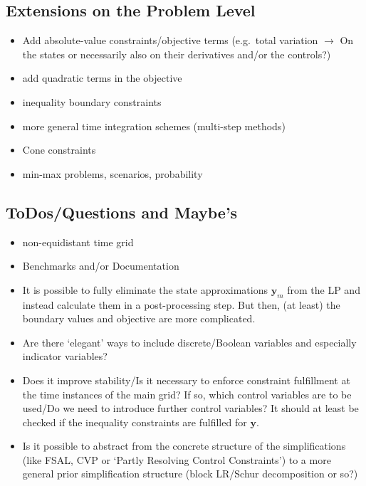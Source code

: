 \documentclass{article}
\newcommand{\vectorfont}[1]{\boldsymbol{#1}}%
\newcommand{\yvec}{\vectorfont{y}}
\begin{document}
\subsection*{Extensions on the Problem Level}

\begin{itemize}
	\item Add absolute-value constraints/objective terms (e.g.\ total variation $\to$ On the states or necessarily also on their derivatives and/or the controls?)
	\item add quadratic terms in the objective
	\item inequality boundary constraints
	\item more general time integration schemes (multi-step methods)
	\item Cone constraints
	\item min-max problems, scenarios, probability
\end{itemize}
\appendix

\subsection*{ToDos/Questions and Maybe's}

\begin{itemize}
	\item non-equidistant time grid
	\item Benchmarks and/or Documentation
	\item It is possible to fully eliminate the state approximations $\yvec_{m}$ from the LP and instead calculate them in a post-processing step.
	But then, (at least) the boundary values and objective are more complicated.
	\item Are there `elegant' ways to include discrete/Boolean variables and especially indicator variables?
	\item Does it improve stability/Is it necessary to enforce constraint fulfillment at the time instances of the main grid? If so, which control variables are to be used/Do we need to introduce further control variables?
	It should at least be checked if the inequality constraints are fulfilled for $\yvec$.
	\item Is it possible to abstract from the concrete structure of the simplifications (like FSAL, CVP or \lq Partly Resolving Control Constraints\rq) to a more general prior simplification structure (block LR/Schur decomposition or so?)
\end{itemize}
\end{document}
